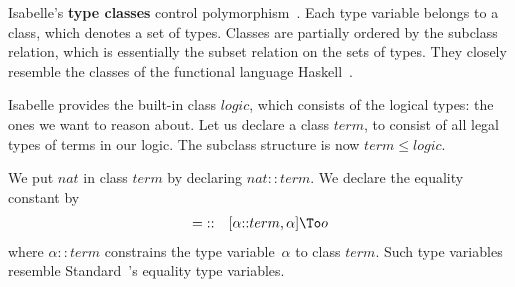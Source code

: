 Isabelle's {\bf type classes} control
polymorphism~\cite{nipkow-prehofer}.  Each type variable belongs to a
class, which denotes a set of types.  Classes are partially ordered by the
subclass relation, which is essentially the subset relation on the sets of
types.  They closely resemble the classes of the functional language
Haskell~\cite{haskell-tutorial,haskell-report}.

Isabelle provides the built-in class $logic$, which consists of the logical
types: the ones we want to reason about.  Let us declare a class $term$, to
consist of all legal types of terms in our logic.  The subclass structure
is now $term\le logic$.

We put $nat$ in class $term$ by declaring $nat{::}term$.  We declare the
equality constant by
\begin{eqnarray*}
  {=}  & :: & [\alpha{::}term,\alpha]\To o 
\end{eqnarray*}
where $\alpha{::}term$ constrains the type variable~$\alpha$ to class
$term$.  Such type variables resemble Standard~\ML's equality type
variables.

